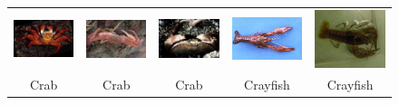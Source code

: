 \begin{figure}[H]
\begin{tabular}{ccccc}
\includegraphics[width=3cm]{Figures/crab/6.jpg}
&
\includegraphics[width=3cm]{Figures/crab/7.jpg}
&
\includegraphics[width=3cm]{Figures/crab/8.jpg}
&
\includegraphics[width=3cm]{Figures/crab/9.jpg}
&
\includegraphics[width=3cm]{Figures/crab/10.jpg}\\
Crab & Crab & Crab & Crayfish & Crayfish\\



\end{tabular}
\end{figure}

